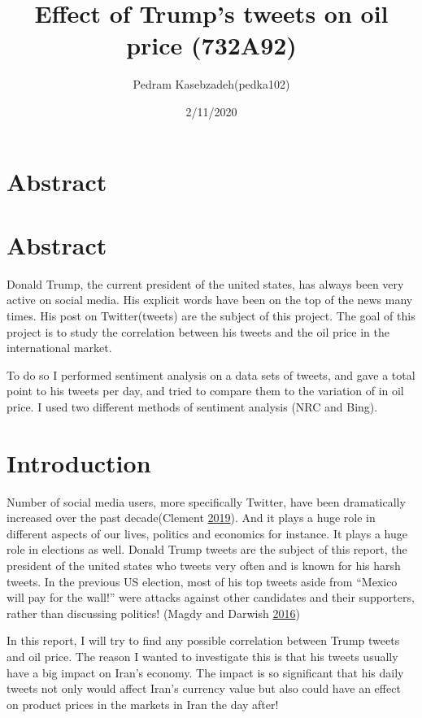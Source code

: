\documentclass[]{article}
\title{Effect of Trump's tweets on oil price (732A92)}
\author{Pedram Kasebzadeh(pedka102)}
\date{2/11/2020}
\begin{document}
\maketitle

\newpage 

\section{Abstract}\label{abstract}

\section{Abstract}\label{abstract-1}

Donald Trump, the current president of the united states, has always
been very active on social media. His explicit words have been on the
top of the news many times. His post on Twitter(tweets) are the subject
of this project. The goal of this project is to study the correlation
between his tweets and the oil price in the international market.

To do so I performed sentiment analysis on a data sets of tweets, and
gave a total point to his tweets per day, and tried to compare them to
the variation of in oil price. I used two different methods of sentiment
analysis (NRC and Bing).

\newpage

\tableofcontents

\newpage

\section{Introduction}\label{introduction}

Number of social media users, more specifically Twitter, have been
dramatically increased over the past decade(Clement
\protect\hyperlink{ref-j_clement_twitter_2019}{2019}). And it plays a
huge role in different aspects of our lives, politics and economics for
instance. It plays a huge role in elections as well. Donald Trump tweets
are the subject of this report, the president of the united states who
tweets very often and is known for his harsh tweets. In the previous US
election, most of his top tweets aside from ``Mexico will pay for the
wall!'' were attacks against other candidates and their supporters,
rather than discussing politics! (Magdy and Darwish
\protect\hyperlink{ref-magdy_trump_2016}{2016})

In this report, I will try to find any possible correlation between
Trump tweets and oil price. The reason I wanted to investigate this is
that his tweets usually have a big impact on Iran's economy. The impact
is so significant that his daily tweets not only would affect Iran's
currency value but also could have an effect on product prices in the
markets in Iran the day after!
\end{document}
